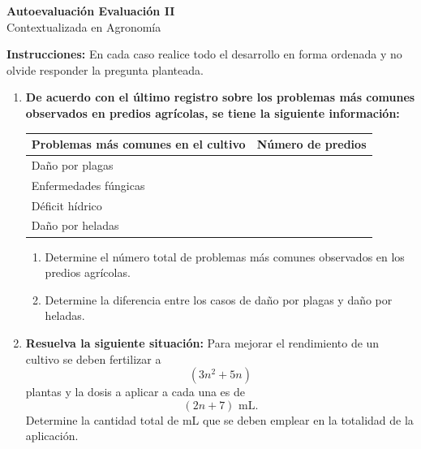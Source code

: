 \documentclass[12pt]{article}
\begin{document}
	
	\begin{center}
		{\LARGE \textbf{Autoevaluación Evaluación II}}\\[0.2cm]
		{\large Contextualizada en Agronomía}
	\end{center}
	
	\vspace{0.4cm}
	
	\textbf{Instrucciones:} En cada caso realice todo el desarrollo en forma ordenada y no olvide responder la pregunta planteada.
	
	\vspace{0.5cm}
	
	\begin{enumerate}
		
		\item \textbf{De acuerdo con el último registro sobre los problemas más comunes observados en predios agrícolas, se tiene la siguiente información:}
		
		\begin{center}
			\begin{tabular}{|m{8cm}|>{\centering\arraybackslash}m{4cm}|}
				\hline
				\textbf{Problemas más comunes en el cultivo} & \textbf{Número de predios} \\
				\hline
				Daño por plagas & \\ \hline
				Enfermedades fúngicas & \\ \hline
				Déficit hídrico & \\ \hline
				Daño por heladas & \\ \hline
			\end{tabular}
		\end{center}
		
		\begin{enumerate}[label=\alph*)]
			\item Determine el número total de problemas más comunes observados en los predios agrícolas.
			\item Determine la diferencia entre los casos de daño por plagas y daño por heladas.
		\end{enumerate}
		
		\item \textbf{Resuelva la siguiente situación:} Para mejorar el rendimiento de un cultivo se deben fertilizar a
		\[
		(3n^2+5n)
		\]
		plantas y la dosis a aplicar a cada una es de
		\[
		(2n+7)\text{ mL}.
		\]
		Determine la cantidad total de mL que se deben emplear en la totalidad de la aplicación.
		

\end{enumerate}
\end{document}
